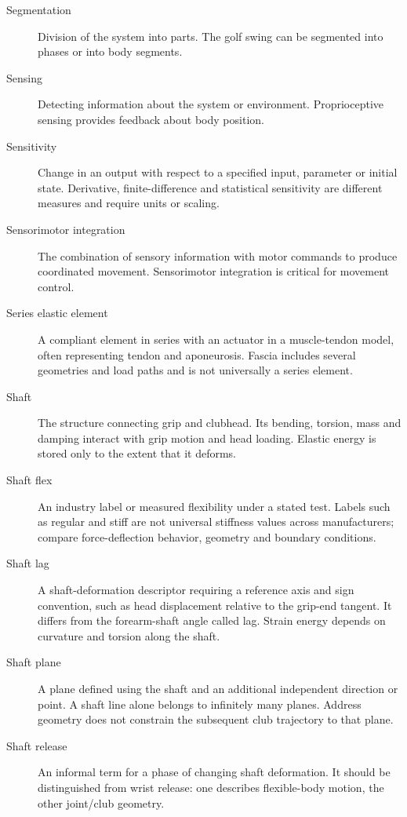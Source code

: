 \begin{description}
\item[Segmentation] Division of the system into parts. The golf swing can be segmented into phases or into body segments.

\item[Sensing] Detecting information about the system or environment. Proprioceptive sensing provides feedback about body position.

\item[Sensitivity] Change in an output with respect to a specified input, parameter or initial state. Derivative, finite-difference and statistical sensitivity are different measures and require units or scaling.

\item[Sensorimotor integration] The combination of sensory information with motor commands to produce coordinated movement. Sensorimotor integration is critical for movement control.

\item[Series elastic element] A compliant element in series with an actuator in a muscle-tendon model, often representing tendon and aponeurosis. Fascia includes several geometries and load paths and is not universally a series element.

\item[Shaft] The structure connecting grip and clubhead. Its bending, torsion, mass and damping interact with grip motion and head loading. Elastic energy is stored only to the extent that it deforms.

\item[Shaft flex] An industry label or measured flexibility under a stated test. Labels such as regular and stiff are not universal stiffness values across manufacturers; compare force-deflection behavior, geometry and boundary conditions.

\item[Shaft lag] A shaft-deformation descriptor requiring a reference axis and sign convention, such as head displacement relative to the grip-end tangent. It differs from the forearm-shaft angle called lag. Strain energy depends on curvature and torsion along the shaft.

\item[Shaft plane] A plane defined using the shaft and an additional independent direction or point. A shaft line alone belongs to infinitely many planes. Address geometry does not constrain the subsequent club trajectory to that plane.

\item[Shaft release] An informal term for a phase of changing shaft deformation. It should be distinguished from wrist release: one describes flexible-body motion, the other joint/club geometry.


\end{description}
